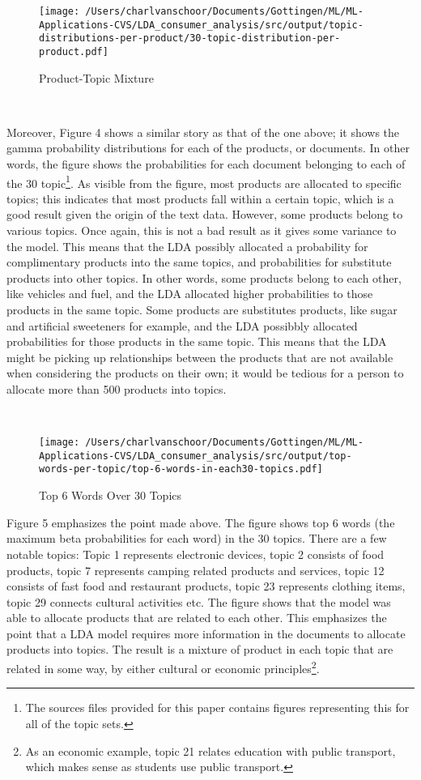 \begin{figure}[!h]
\caption{Product-Topic Mixture}\centering
\texttt{[image: /Users/charlvanschoor/Documents/Gottingen/ML/ML-Applications-CVS/LDA\_consumer\_analysis/src/output/topic-distributions-per-product/30-topic-distribution-per-product.pdf]}
\end{figure}
\

Moreover, Figure 4 shows a similar story as that of the one above; it shows the gamma probability distributions for each of the products, or documents. In other words, the figure shows the probabilities for each document belonging to each of the 30 topic\footnote{The sources files provided for this paper contains figures representing this for all of the topic sets.}. As visible from the figure, most products are allocated to specific topics; this indicates that most products fall within a certain topic, which is a good result given the origin of the text data. However, some products belong to various topics. Once again, this is not a bad result as it gives some variance to the model. This means that the LDA possibly allocated a probability for complimentary products into the same topics, and probabilities for substitute products into other topics. In other words, some products belong to each other, like vehicles and fuel, and the LDA allocated higher probabilities to those products in the same topic. Some products are substitutes products, like sugar and artificial sweeteners for example, and the LDA possibbly allocated probabilities for those products in the same topic. This means that the LDA might be picking up relationships between the products that are not available when considering the products on their own; it would be tedious for a person to allocate more than 500 products into topics. 


\

\begin{figure}[!h]
\caption{Top 6 Words Over 30 Topics}\centering
\texttt{[image: /Users/charlvanschoor/Documents/Gottingen/ML/ML-Applications-CVS/LDA\_consumer\_analysis/src/output/top-words-per-topic/top-6-words-in-each30-topics.pdf]}
\end{figure}

Figure 5 emphasizes the point made above. The figure shows top 6 words (the maximum beta probabilities for each word) in the 30 topics. There are a few notable topics: Topic 1 represents electronic devices, topic 2 consists of food products, topic 7 represents camping related products and services, topic 12 consists of fast food and restaurant products, topic 23 represents clothing items, topic 29 connects cultural activities etc. The figure shows that the model was able to allocate products that are related to each other. This emphasizes the point that a LDA model requires more information in the documents to allocate products into topics. The result is a mixture of product in each topic that are related in some way, by either cultural or economic principles\footnote{As an economic example, topic 21 relates education with public transport, which makes sense as students use public transport.}. 




